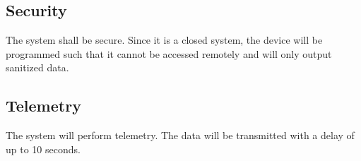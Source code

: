 \documentclass[letterpaper,10pt]{article}
\begin{document}
\subsection{Security}
The system shall be secure. Since it is a closed system, the device will be programmed such that it cannot be accessed remotely and will only output sanitized data.
\subsection{Telemetry}
The system will perform telemetry. The data will be transmitted with a delay of up to 10 seconds.
\end{document}
